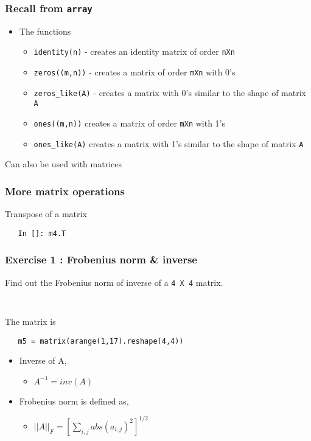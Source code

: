 \documentclass[presentation]{beamer}
\begin{document}
\begin{frame}
\frametitle{Recall from \texttt{array}}
\label{sec-6}

\begin{itemize}
\item The functions

\begin{itemize}
\item \texttt{identity(n)} - 
      creates an identity matrix of order \texttt{nXn}
\item \texttt{zeros((m,n))} - 
      creates a matrix of order \texttt{mXn} with 0's
\item \texttt{zeros\_like(A)} - 
      creates a matrix with 0's similar to the shape of matrix \texttt{A}
\item \texttt{ones((m,n))}
      creates a matrix of order \texttt{mXn} with 1's
\item \texttt{ones\_like(A)}
      creates a matrix with 1's similar to the shape of matrix \texttt{A}
\end{itemize}

\end{itemize}

  Can also be used with matrices
\end{frame}
\begin{frame}[fragile]
\frametitle{More matrix operations}
\label{sec-7}

  Transpose of a matrix
\begin{verbatim}
   In []: m4.T
\end{verbatim}
\end{frame}
\begin{frame}[fragile]
\frametitle{Exercise 1 : Frobenius norm \& inverse}
\label{sec-8}

  Find out the Frobenius norm of inverse of a \texttt{4 X 4} matrix.
\begin{verbatim}
   
\end{verbatim}

  The matrix is
\begin{verbatim}
   m5 = matrix(arange(1,17).reshape(4,4))
\end{verbatim}

\begin{itemize}
\item Inverse of A,

\begin{itemize}
\item $A^{-1} = inv(A)$
\end{itemize}

\item Frobenius norm is defined as,

\begin{itemize}
\item $||A||_F = [\sum_{i,j} abs(a_{i,j})^2]^{1/2}$
\end{itemize}

\end{itemize}
\end{frame}
\end{document}
